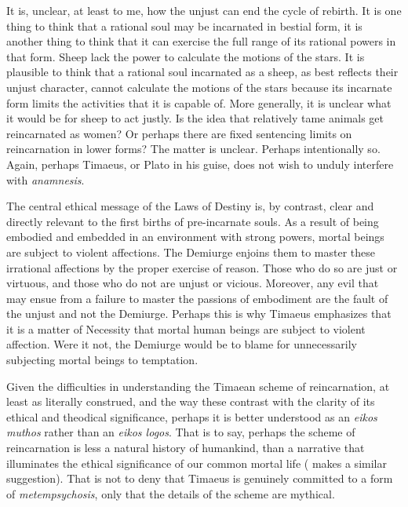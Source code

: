 It is, unclear, at least to me, how the unjust can end the cycle of rebirth. It is one thing to think that a rational soul may be incarnated in bestial form, it is another thing to think that it can exercise the full range of its rational powers in that form. Sheep lack the power to calculate the motions of the stars. It is plausible to think that a rational soul incarnated as a sheep, as best reflects their unjust character, cannot calculate the motions of the stars because its incarnate form limits the activities that it is capable of. More generally, it is unclear what it would be for sheep to act justly. Is the idea that relatively tame animals get reincarnated as women? Or perhaps there are fixed sentencing limits on reincarnation in lower forms? The matter is unclear. Perhaps intentionally so. Again, perhaps Timaeus, or Plato in his guise, does not wish to unduly interfere with \emph{anamnesis}.

The central ethical message of the Laws of Destiny is, by contrast, clear and directly relevant to the first births of pre-incarnate souls. As a result of being embodied and embedded in an environment with strong powers, mortal beings are subject to violent affections. The Demiurge enjoins them to master these irrational affections by the proper exercise of reason. Those who do so are just or virtuous, and those who do not are unjust or vicious. Moreover, any evil that may ensue from a failure to master the passions of embodiment are the fault of the unjust and not the Demiurge. Perhaps this is why Timaeus emphasizes that it is a matter of Necessity that mortal human beings are subject to violent affection. Were it not, the Demiurge would be to blame for unnecessarily subjecting mortal beings to temptation. 

Given the difficulties in understanding the Timaean scheme of reincarnation, at least as literally construed, and the way these contrast with the clarity of its ethical and theodical significance, perhaps it is better understood as an \emph{eikos muthos} rather than an \emph{eikos logos}. That is to say, perhaps the scheme of reincarnation is less a natural history of humankind, than a narrative that illuminates the ethical significance of our common mortal life (\citealt[262]{Taylor:1929ov} makes a similar suggestion). That is not to deny that Timaeus is genuinely committed to a form of \emph{metempsychosis}, only that the details of the scheme are mythical.

